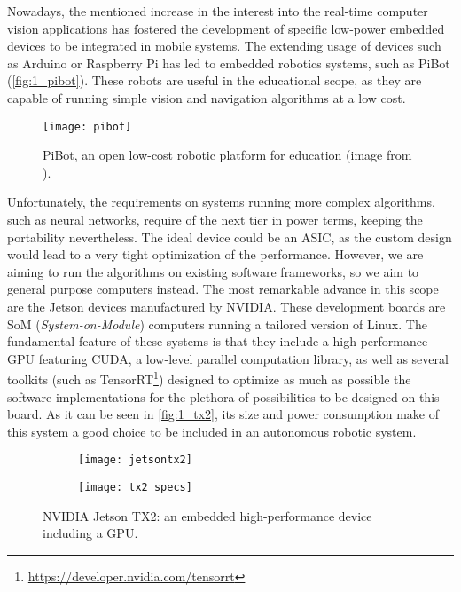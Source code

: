 Nowadays, the mentioned increase in the interest into the real-time computer vision applications has fostered the development of specific low-power embedded devices to be integrated in mobile systems. The extending usage of devices such as Arduino or Raspberry Pi has led to embedded robotics systems, such as PiBot \cite{pibot} (\autoref{fig:1_pibot}). These robots are useful in the educational scope, as they are capable of running simple vision and navigation algorithms at a low cost.
\begin{figure}[h]
	\centering
	\texttt{[image: pibot]}
	\caption{PiBot, an open low-cost robotic platform for education (image from \cite{pibot}).}
	\label{fig:1_pibot}
\end{figure}
Unfortunately, the requirements on systems running more complex algorithms, such as neural networks, require of the next tier in power terms, keeping the portability nevertheless. The ideal device could be an ASIC, as the custom design would lead to a very tight optimization of the performance. However, we are aiming to run the algorithms on existing software frameworks, so we aim to general purpose computers instead. The most remarkable advance in this scope are the Jetson devices manufactured by NVIDIA. These development boards are SoM (\textit{System-on-Module}) computers running a tailored version of Linux. The fundamental feature of these systems is that they include a high-performance GPU featuring CUDA, a low-level parallel computation library, as well as several toolkits (such as TensorRT\footnote{\url{https://developer.nvidia.com/tensorrt}}) designed to optimize as much as possible the software implementations for the plethora of possibilities to be designed on this board. As it can be seen in \autoref{fig:1_tx2}, its size and power consumption make of this system a good choice to be included in an autonomous robotic system. 
\begin{figure}[h!]
	\begin{subfigure}[h]{0.45\linewidth}
		\centering
		\texttt{[image: jetsontx2]}

	\end{subfigure}
	\begin{subfigure}[h]{0.45\linewidth}
		\centering
		\texttt{[image: tx2\_specs]}
	\end{subfigure}
	\caption{NVIDIA Jetson TX2: an embedded high-performance device including a GPU.}
	\label{fig:1_tx2}
\end{figure}


